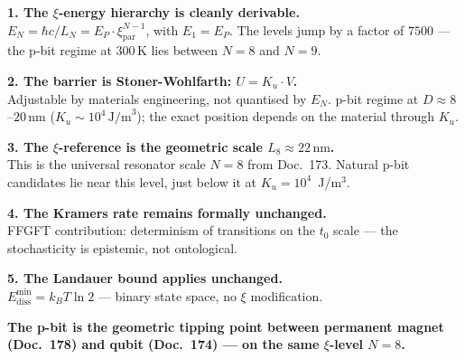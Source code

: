 	\begin{conclusionBox}
		\textbf{1. The $\xi$-energy hierarchy is cleanly derivable.}\\
		$E_N = \hbar c/L_N = E_P\cdot\xi_\text{par}^{N-1}$, with $E_1 = E_P$.
		The levels jump by a factor of $7500$ --- the p-bit regime at
		300\,K lies between $N=8$ and $N=9$.
		
		\textbf{2. The barrier is Stoner-Wohlfarth: $U = K_u \cdot V$.}\\
		Adjustable by materials engineering, not quantised by $E_N$.
		p-bit regime at $D \approx 8$--$20\,\text{nm}$ ($K_u \sim 10^4\,\text{J/m}^3$);
		the exact position depends on the material through $K_u$.
		
		\textbf{3. The $\xi$-reference is the geometric scale $L_8 \approx 22\,\text{nm}$.}\\
		This is the universal resonator scale $N=8$ from Doc.~173.
		Natural p-bit candidates lie near this level,
		just below it at $K_u = 10^4$~J/m$^3$.
		
		\textbf{4. The Kramers rate remains formally unchanged.}\\
		FFGFT contribution: determinism of transitions on the $t_0$ scale ---
		the stochasticity is epistemic, not ontological.
		
		\textbf{5. The Landauer bound applies unchanged.}\\
		$E_\text{diss}^\text{min} = k_BT\ln 2$ --- binary state space,
		no $\xi$ modification.
		
		\vspace{0.5em}
		\textbf{The p-bit is the geometric tipping point between permanent magnet
			(Doc.~178) and qubit (Doc.~174) --- on the same $\xi$-level $N=8$.}
	\end{conclusionBox}
	
